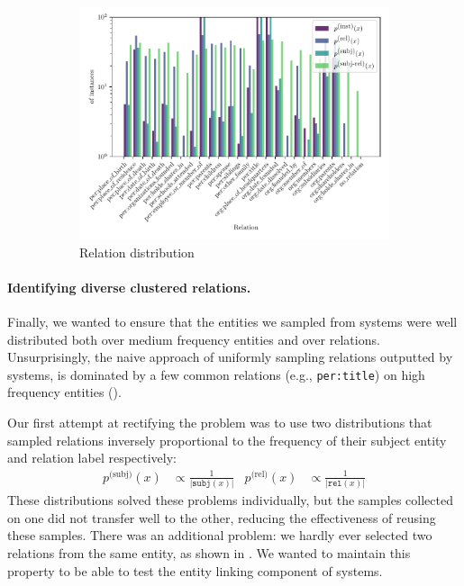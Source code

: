 \begin{figure}
  \caption[Comparison of relation sampling distributions]{\label{fig:kbpo:selective-supervised-entity}
  }
\end{figure}

\begin{figure}
  \centering
  \begin{subfigure}{\textwidth}
    \includegraphics[width=\textwidth]{figures/analysis/selective_supervised_relations}
    \caption{Relation distribution}
  \end{subfigure}

  \caption[Comparison of relation sampling distributions]{\label{fig:kbpo:selective-supervised-relation}
  }
\end{figure}

\paragraph{Identifying diverse clustered relations.}
Finally, we wanted to ensure that the entities we sampled from systems were well distributed both over medium frequency entities and over relations.
Unsurprisingly, the naive approach of uniformly sampling relations outputted by systems, is dominated by a few common relations (e.g., \texttt{per:title}) on high frequency entities ().

Our first attempt at rectifying the problem was to use two distributions that sampled relations inversely proportional to the frequency of their subject entity and relation label respectively:
\begin{align*}
  p^{\text{(subj)}}(x) &\propto \frac{1}{|\texttt{subj}(x)|} &
  p^{\text{(rel)}}(x) &\propto \frac{1}{|\texttt{rel}(x)|}
\end{align*}
These distributions solved these problems individually, but the samples collected on one did not transfer well to the other, reducing the effectiveness of reusing these samples.
There was an additional problem: we hardly ever selected two relations from the same entity, as shown in .
We wanted to maintain this property to be able to test the entity linking component of systems.

